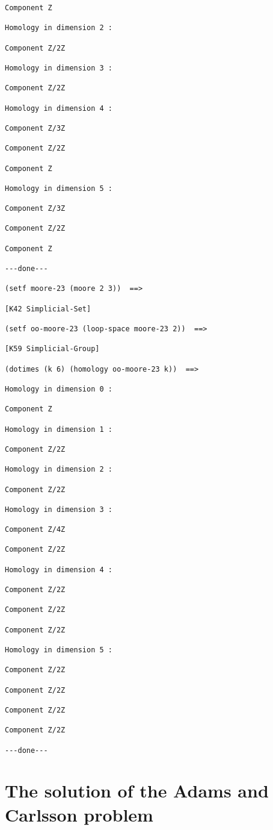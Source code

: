 {\begin{verbatim}
Component Z

Homology in dimension 2 :

Component Z/2Z

Homology in dimension 3 :

Component Z/2Z

Homology in dimension 4 :

Component Z/3Z

Component Z/2Z

Component Z

Homology in dimension 5 :

Component Z/3Z

Component Z/2Z

Component Z

---done---

(setf moore-23 (moore 2 3))  ==>

[K42 Simplicial-Set]

(setf oo-moore-23 (loop-space moore-23 2))  ==>

[K59 Simplicial-Group]

(dotimes (k 6) (homology oo-moore-23 k))  ==>

Homology in dimension 0 :

Component Z

Homology in dimension 1 :

Component Z/2Z

Homology in dimension 2 :

Component Z/2Z

Homology in dimension 3 :

Component Z/4Z

Component Z/2Z

Homology in dimension 4 :

Component Z/2Z

Component Z/2Z

Component Z/2Z

Homology in dimension 5 :

Component Z/2Z

Component Z/2Z

Component Z/2Z

Component Z/2Z

---done---

\end{verbatim}}

\newpage

\section {The solution of the Adams and Carlsson problem}

